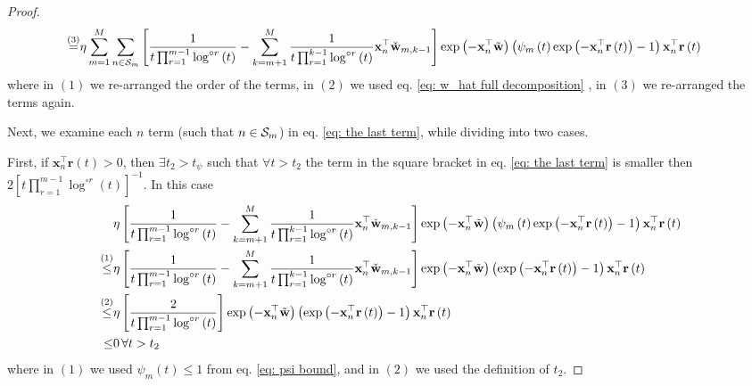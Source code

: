 \documentclass[twoside,11pt,english]{article}
\begin{document}
{\begin{proof}
{\begin{align}
\overset{\left(3\right)}{=} & \eta\sum_{m=1}^{M}\sum_{n\in\mathcal{S}_{m}}\left[\frac{1}{t\prod_{r=1}^{m-1}\log^{\circ r}\left(t\right)}-\sum_{k=m+1}^{M}\frac{1}{t\prod_{r=1}^{k-1}\log^{\circ r}\left(t\right)}\mathbf{x}_{n}^{\top}\check{\mathbf{w}}_{m,k-1}\right]\exp\left(-\mathbf{x}_{n}^{\top}\tilde{\mathbf{w}}\right)\left(\psi_{m}\left(t\right)\exp\left(-\mathbf{x}_{n}^{\top}\mathbf{r}\left(t\right)\right)-1\right)\mathbf{x}_{n}^{\top}\mathbf{r}\left(t\right)\label{eq: the last term}
\end{align}}
where in $\left(1\right)$ we re-arranged the order of the terms,
in $\left(2\right)$ we used eq. \ref{eq: w_hat full decomposition} , in $\left(3\right)$
we re-arranged the terms again. 

Next, we examine each $n$ term (such that $n\in\mathcal{S}_{m}$) in eq.
\ref{eq: the last term}, while dividing into two cases.

First, if $\mathbf{x}_{n}^{\top}\mathbf{r}\left(t\right)>0$, then
$\exists t_{2}>t_{\psi}$ such that $\forall t>t_{2}$ the term in
the square bracket in eq. \ref{eq: the last term} is smaller then
$2\left[t\prod_{r=1}^{m-1}\log^{\circ r}\left(t\right)\right]^{-1}$.
In this case
\begin{align*}
 & \eta\left[\frac{1}{t\prod_{r=1}^{m-1}\log^{\circ r}\left(t\right)}-\sum_{k=m+1}^{M}\frac{1}{t\prod_{r=1}^{k-1}\log^{\circ r}\left(t\right)}\mathbf{x}_{n}^{\top}\check{\mathbf{w}}_{m,k-1}\right]\exp\left(-\mathbf{x}_{n}^{\top}\tilde{\mathbf{w}}\right)\left(\psi_{m}\left(t\right)\exp\left(-\mathbf{x}_{n}^{\top}\mathbf{r}\left(t\right)\right)-1\right)\mathbf{x}_{n}^{\top}\mathbf{r}\left(t\right)\\
\overset{\left(1\right)}{\leq} & \eta\left[\frac{1}{t\prod_{r=1}^{m-1}\log^{\circ r}\left(t\right)}-\sum_{k=m+1}^{M}\frac{1}{t\prod_{r=1}^{k-1}\log^{\circ r}\left(t\right)}\mathbf{x}_{n}^{\top}\check{\mathbf{w}}_{m,k-1}\right]\exp\left(-\mathbf{x}_{n}^{\top}\tilde{\mathbf{w}}\right)\left(\exp\left(-\mathbf{x}_{n}^{\top}\mathbf{r}\left(t\right)\right)-1\right)\mathbf{x}_{n}^{\top}\mathbf{r}\left(t\right)\\
\overset{\left(2\right)}{\leq} & \eta\left[\frac{2}{t\prod_{r=1}^{m-1}\log^{\circ r}\left(t\right)}\right]\exp\left(-\mathbf{x}_{n}^{\top}\tilde{\mathbf{w}}\right)\left(\exp\left(-\mathbf{x}_{n}^{\top}\mathbf{r}\left(t\right)\right)-1\right)\mathbf{x}_{n}^{\top}\mathbf{r}\left(t\right)\\
\leq & 0\,\forall t>t_{2}
\end{align*}
where in $\left(1\right)$ we used $\psi_{m}\left(t\right)\leq1$
from eq. \ref{eq: psi bound}, and in $\left(2\right)$ we used the
definition of $t_{2}$.


\end{proof}}
\end{document}
